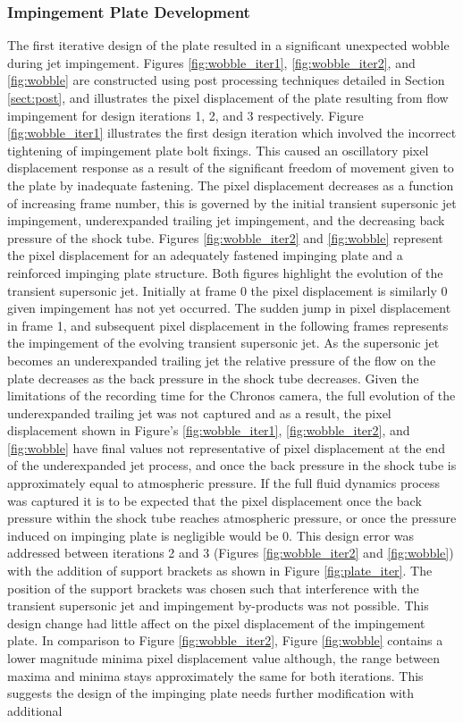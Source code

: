 \subsubsection{Impingement Plate Development}
The first iterative design of the plate resulted in a significant unexpected wobble during jet impingement. Figures \ref{fig:wobble_iter1}, \ref{fig:wobble_iter2}, and \ref{fig:wobble} are constructed using post processing techniques detailed in Section \ref{sect:post}, and illustrates the pixel displacement of the plate resulting from flow impingement for design iterations 1, 2, and 3 respectively. Figure \ref{fig:wobble_iter1} illustrates the first design iteration which involved the incorrect tightening of impingement plate bolt fixings. This caused an oscillatory pixel displacement response as a result of the significant freedom of movement given to the plate by inadequate fastening. The pixel displacement decreases as a function of increasing frame number, this is governed by the initial transient supersonic jet impingement, underexpanded trailing jet impingement, and the decreasing back pressure of the shock tube. Figures \ref{fig:wobble_iter2} and \ref{fig:wobble} represent the pixel displacement for an adequately fastened impinging plate and a reinforced impinging plate structure. Both figures highlight the evolution of the transient supersonic jet. Initially at frame 0 the pixel displacement is similarly 0 given impingement has not yet occurred. The sudden jump in pixel displacement in frame 1, and subsequent pixel displacement in the following frames represents the impingement of the evolving transient supersonic jet. As the supersonic jet becomes an underexpanded trailing jet the relative pressure of the flow on the plate decreases as the back pressure in the shock tube decreases. Given the limitations of the recording time for the Chronos camera, the full evolution of the underexpanded trailing jet was not captured and as a result, the pixel displacement shown in Figure's \ref{fig:wobble_iter1}, \ref{fig:wobble_iter2}, and \ref{fig:wobble} have final values not representative of pixel displacement at the end of the underexpanded jet process, and once the back pressure in the shock tube is approximately equal to atmospheric pressure. If the full fluid dynamics process was captured it is to be expected that the pixel displacement once the back pressure within the shock tube reaches atmospheric pressure, or once the pressure induced on impinging plate is negligible would be 0. This design error was addressed between iterations 2 and 3 (Figures \ref{fig:wobble_iter2} and \ref{fig:wobble}) with the addition of support brackets as shown in Figure \ref{fig:plate_iter}. The position of the support brackets was chosen such that interference with the transient supersonic jet and impingement by-products was not possible. This design change had little affect on the pixel displacement of the impingement plate. In comparison to Figure \ref{fig:wobble_iter2}, Figure \ref{fig:wobble} contains a lower magnitude minima pixel displacement value although, the range between maxima and minima stays approximately the same for both iterations. This suggests the design of the impinging plate needs further modification with additional 